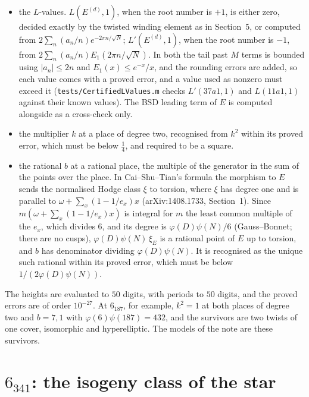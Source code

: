 \documentclass[11pt,reqno]{amsart}
\theoremstyle{plain}
\theoremstyle{definition}
\begin{document}
\begin{itemize}
\item the $L$-values. $L(E^{(d)},1)$, when the root number is $+1$, is either zero, decided exactly by the twisted
winding element as in Section~5, or computed from $2\sum_n (a_n/n)e^{-2\pi n/\sqrt N}$; $L'(E^{(d)},1)$, when the root
number is $-1$, from $2\sum_n (a_n/n)E_1(2\pi n/\sqrt N)$. In both the tail past $M$ terms is bounded using
$|a_n|\le 2n$ and $E_1(x)\le e^{-x}/x$, and the rounding errors are added, so each value comes with a proved error,
and a value used as nonzero must exceed it (\texttt{tests/CertifiedLValues.m} checks $L'(37a1,1)$ and $L(11a1,1)$
against their known values). The BSD leading term of $E$ is computed alongside as a cross-check only.
\item the multiplier $k$ at a place of degree two, recognised from $k^2$ within its proved error, which must be
below $\tfrac14$, and required to be a square.
\item the rational $b$ at a rational place, the multiple of the generator in the sum of the points over the place.
In Cai--Shu--Tian's formula the morphism to $E$ sends the normalised Hodge class $\xi$ to torsion, where $\xi$ has
degree one and is parallel to $\omega+\sum_x(1-1/e_x)x$ (arXiv:1408.1733, Section~1). Since $m(\omega+\sum_x(1-1/e_x)x)$
is integral for $m$ the least common multiple of the $e_x$, which divides $6$, and its degree is
$\varphi(D)\psi(N)/6$ (Gauss--Bonnet; there are no cusps), $\varphi(D)\psi(N)\,\xi_E$ is a rational point of $E$ up
to torsion, and $b$ has denominator dividing $\varphi(D)\psi(N)$. It is recognised as the unique such rational
within its proved error, which must be below $1/(2\varphi(D)\psi(N))$.
\end{itemize}
The heights are evaluated to $50$ digits, with periods to $50$ digits, and the proved errors are of order $10^{-27}$.
At $6_{187}$, for example, $k^2=1$ at both places of degree two and $b=7,1$ with $\varphi(6)\psi(187)=432$, and the
survivors are two twists of one cover, isomorphic and hyperelliptic. The models of the note are these survivors.

\section{$6_{341}$: the isogeny class of the star}
\end{document}
